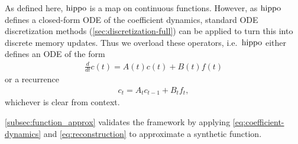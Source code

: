 \documentclass[../hippo.tex]{subfiles}
\begin{document}
As defined here, $\operatorname{hippo}$ is a map on continuous functions.
However, as $\operatorname{hippo}$ defines a closed-form ODE of the coefficient dynamics,
standard ODE discretization methods (\cref{sec:discretization-full}) can be applied to turn this into discrete memory updates.
Thus we overload these operators, i.e.\ $\operatorname{hippo}$ either defines an ODE
of the form
\begin{align*}
  \frac{d}{dt} c(t) = A(t) c(t) + B(t) f(t)
\end{align*}
or a recurrence
\begin{align*}
  c_{t} = A_t c_{t-1} + B_t f_t,
\end{align*}
whichever is clear from context.

\cref{subsec:function_approx} validates the framework by applying \eqref{eq:coefficient-dynamics} and \eqref{eq:reconstruction} to approximate a synthetic function.
\end{document}
